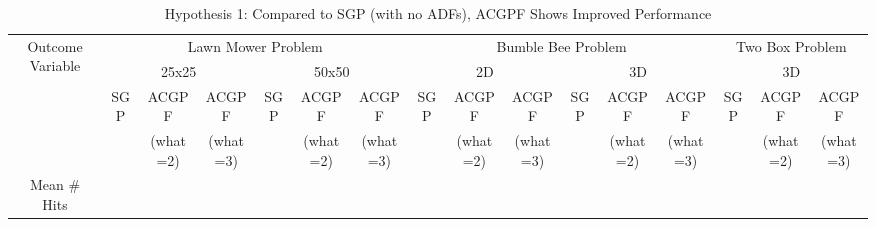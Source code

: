 \begin{sidewaystable}[ht]
\centering
\caption{Hypothesis 1: Compared to SGP (with no ADFs), ACGPF Shows Improved Performance}
\scalebox{0.8} %
{
\begin{tabular}{|c|c|c|c|c|c|c|c|c|c|c|c|c|c|c|c|}
 \hline
 \multicolumn{1}{|c|}{\multirow{4}{0.75in}{Outcome Variable}} & \multicolumn{6}{|c|}{Lawn Mower Problem}
                                                              & \multicolumn{6}{|c|}{Bumble Bee Problem}
							      & \multicolumn{3}{|c|}{Two Box Problem}\\
 \cline{2-16}
 \multicolumn{1}{|c|}{} & \multicolumn{3}{|c|}{25x25} & \multicolumn{3}{|c|}{50x50} 
                        & \multicolumn{3}{|c|}{2D} & \multicolumn{3}{|c|}{3D}
                        & \multicolumn{3}{|c|}{3D} 
			\\ 
 \cline{2-16}
 \multicolumn{1}{|c|}{} & \multicolumn{1}{|c|}{SGP} & \multicolumn{1}{|c|}{ACGPF} & \multicolumn{1}{|c|}{ACGPF} 
			& \multicolumn{1}{|c|}{SGP} & \multicolumn{1}{|c|}{ACGPF} & \multicolumn{1}{|c|}{ACGPF} 
                        & \multicolumn{1}{|c|}{SGP} & \multicolumn{1}{|c|}{ACGPF} & \multicolumn{1}{|c|}{ACGPF} 
			& \multicolumn{1}{|c|}{SGP} & \multicolumn{1}{|c|}{ACGPF} & \multicolumn{1}{|c|}{ACGPF} 
                        & \multicolumn{1}{|c|}{SGP} & \multicolumn{1}{|c|}{ACGPF} & \multicolumn{1}{|c|}{ACGPF} 
			\\ 
 \multicolumn{1}{|c|}{} & \multicolumn{1}{|c|}{} & \multicolumn{1}{|c|}{(what=2)} & \multicolumn{1}{|c|}{(what=3)} 
			& \multicolumn{1}{|c|}{} & \multicolumn{1}{|c|}{(what=2)} & \multicolumn{1}{|c|}{(what=3)} 
                        & \multicolumn{1}{|c|}{} & \multicolumn{1}{|c|}{(what=2)} & \multicolumn{1}{|c|}{(what=3)} 
			& \multicolumn{1}{|c|}{} & \multicolumn{1}{|c|}{(what=2)} & \multicolumn{1}{|c|}{(what=3)} 
                        & \multicolumn{1}{|c|}{} & \multicolumn{1}{|c|}{(what=2)} & \multicolumn{1}{|c|}{(what=3)} 
			\\ 
 \hline
 \multicolumn{1}{|c|}{\multirow{1}{0.75in}{Mean $\#$ Hits}} 
			& \multicolumn{1}{|c|}{} & \multicolumn{1}{|c|}{} & \multicolumn{1}{|c|}{} 
			& \multicolumn{1}{|c|}{} & \multicolumn{1}{|c|}{} & \multicolumn{1}{|c|}{} 
                        & \multicolumn{1}{|c|}{} & \multicolumn{1}{|c|}{} & \multicolumn{1}{|c|}{} 
			& \multicolumn{1}{|c|}{} & \multicolumn{1}{|c|}{} & \multicolumn{1}{|c|}{} 
                        & \multicolumn{1}{|c|}{} & \multicolumn{1}{|c|}{} & \multicolumn{1}{|c|}{} 

\end{tabular}}
\end{sidewaystable}
